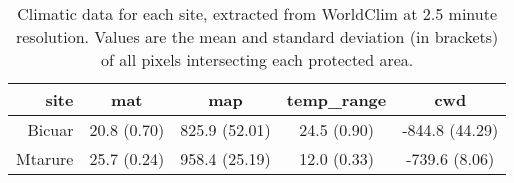 \begin{table}
\centering
\begin{tabular}{rcccc}
  \hline
site & mat & map & temp_range & cwd \\ 
  \hline
Bicuar & 20.8 (0.70) & 825.9 (52.01) & 24.5 (0.90) & -844.8 (44.29) \\ 
  Mtarure & 25.7 (0.24) & 958.4 (25.19) & 12.0 (0.33) & -739.6 (8.06) \\ 
   \hline
\end{tabular}
\caption{Climatic data for each site, extracted from WorldClim at 2.5 minute resolution. Values are the mean and standard deviation (in brackets) of all pixels intersecting each protected area.} 
\label{clim}
\end{table}

